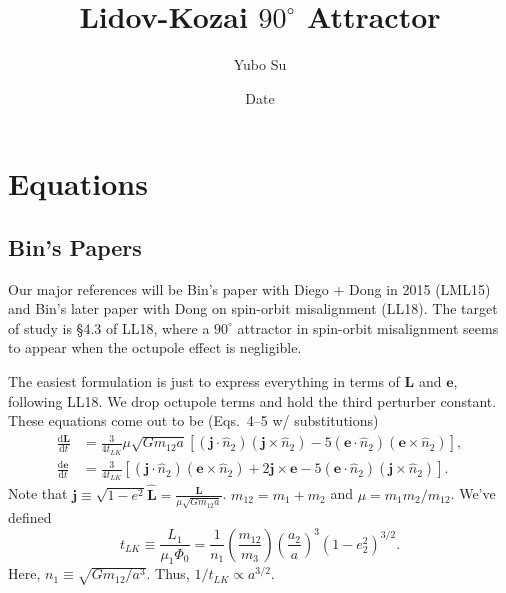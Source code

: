 \documentclass[11pt,
        usenames, %
        dvipsnames %
    ]{article}
\newcommand*{\rd}[2]{\frac{\mathrm{d}#1}{\mathrm{d}#2}}
\newcommand*{\bm}[1]{\boldsymbol{\mathbf{#1}}}
\newcommand*{\p}[1]{\left(#1\right)}
\newcommand*{\s}[1]{\left[#1\right]}
\begin{document}
\def\Snospace~{\S{}} %
\renewcommand*{\sectionautorefname}{\Snospace}
\renewcommand*{\appendixautorefname}{\Snospace}
\renewcommand*{\figureautorefname}{Fig.}
\renewcommand*{\equationautorefname}{Eq.}
\renewcommand*{\tableautorefname}{Tab.}


\pagestyle{fancy}
\rhead{}
\cfoot{\thepage/\pageref{LastPage}}

\title{Lidov-Kozai $90^\circ$ Attractor}
\author{Yubo Su}
\date{Date}

\maketitle

\section{Equations}

\subsection{Bin's Papers}

Our major references will be Bin's paper with Diego + Dong in 2015 (LML15) and
Bin's later paper with Dong on spin-orbit misalignment (LL18). The target of
study is \S4.3 of LL18, where a $90^\circ$ attractor in spin-orbit misalignment
seems to appear when the octupole effect is negligible.

The easiest formulation is just to express everything in terms of $\bm{L}$ and
$\bm{e}$, following LL18. We drop octupole terms and hold the third perturber
constant. These equations come out to be (Eqs.~4--5 w/ substitutions)
\begin{align}
    \rd{\bm{L}}{t} &= \frac{3}{4t_{LK}} \mu \sqrt{Gm_{12}a} \s{
        \p{\bm{j} \cdot \hat{n}_2} \p{\bm{j} \times \hat{n}_2}
        - 5\p{\bm{e} \cdot \hat{n}_2}\p{\bm{e} \times \hat{n}_2}
        },\\
    \rd{\bm{e}}{t} &= \frac{3}{4t_{LK}} \s{
        \p{\bm{j} \cdot \hat{n}_2} \p{\bm{e} \times \hat{n}_2}
        + 2\bm{j} \times \bm{e}
        - 5\p{\bm{e} \cdot \hat{n}_2}\p{\bm{j} \times \hat{n}_2}
        }.
\end{align}
Note that $\bm{j} \equiv \sqrt{1 - e^2}\hat{\bm{L}} = \frac{\bm{L}}{\mu
\sqrt{Gm_{12}a}}$. $m_{12} = m_1 + m_2$ and $\mu = m_1m_2/m_{12}$. We've defined
\begin{equation}
    t_{LK} \equiv \frac{L_1}{\mu_1 \Phi_0}
        = \frac{1}{n_1}\p{\frac{m_{12}}{m_3}}
            \p{\frac{a_2}{a}}^3
            \p{1 - e_2^2}^{3/2}.
\end{equation}
Here, $n_1 \equiv \sqrt{Gm_{12}/a^3}$. Thus, $1 / t_{LK} \propto a^{3/2}$.
\end{document}
